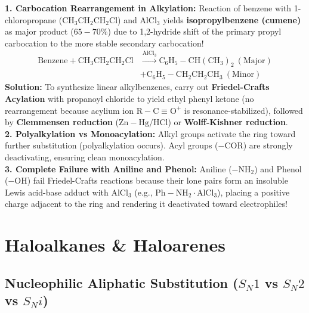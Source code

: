 \documentclass[10pt,twoside,openright]{book}
\begin{document}
\begin{trapbox}
\textbf{1. Carbocation Rearrangement in Alkylation:} Reaction of benzene with 1-chloropropane ($\mathrm{CH_3CH_2CH_2Cl}$) and $\mathrm{AlCl_3}$ yields \textbf{isopropylbenzene (cumene)} as major product ($65-70\%$) due to 1,2-hydride shift of the primary propyl carbocation to the more stable secondary carbocation!
\begin{align}
  \text{Benzene} + \mathrm{CH_3CH_2CH_2Cl} &\xrightarrow{\mathrm{AlCl_3}} \mathrm{C_6H_5-CH(CH_3)_2} \ (\text{Major}) \\
  &+ \mathrm{C_6H_5-CH_2CH_2CH_3} \ (\text{Minor})
\end{align}
\textbf{Solution:} To synthesize linear alkylbenzenes, carry out \textbf{Friedel-Crafts Acylation} with propanoyl chloride to yield ethyl phenyl ketone (no rearrangement because acylium ion $\mathrm{R-C\equiv O^+}$ is resonance-stabilized), followed by \textbf{Clemmensen reduction} ($\mathrm{Zn-Hg / HCl}$) or \textbf{Wolff-Kishner reduction}.\\
\textbf{2. Polyalkylation vs Monoacylation:} Alkyl groups activate the ring toward further substitution (polyalkylation occurs). Acyl groups ($-\mathrm{COR}$) are strongly deactivating, ensuring clean monoacylation.\\
\textbf{3. Complete Failure with Aniline and Phenol:} Aniline ($\mathrm{-NH_2}$) and Phenol ($\mathrm{-OH}$) fail Friedel-Crafts reactions because their lone pairs form an insoluble Lewis acid-base adduct with $\mathrm{AlCl_3}$ (e.g., $\mathrm{Ph-NH_2\cdot AlCl_3}$), placing a positive charge adjacent to the ring and rendering it deactivated toward electrophiles!
\end{trapbox}

\section{Haloalkanes \& Haloarenes}

\subsection{Nucleophilic Aliphatic Substitution (\texorpdfstring{$S_N1$}{SN1} vs \texorpdfstring{$S_N2$}{SN2} vs \texorpdfstring{$S_Ni$}{SNi})}
\end{document}
